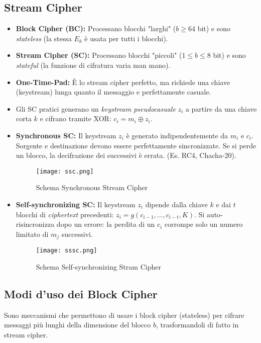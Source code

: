 \documentclass[../main.tex]{subfiles}
\begin{document}
\subsection{Stream Cipher}
\begin{itemize}
    \item \textbf{Block Cipher (BC):} Processano blocchi "larghi" ($b \ge 64$ bit) e sono \emph{stateless} (la stessa $E_k$ è usata per tutti i blocchi).
    \item \textbf{Stream Cipher (SC):} Processano blocchi "piccoli" ($1 \le b \le 8$ bit) e sono \emph{stateful} (la funzione di cifratura varia man mano).
    \item \textbf{One-Time-Pad:} È lo stream cipher perfetto, ma richiede una chiave (keystream) lunga quanto il messaggio e perfettamente casuale.
    \item Gli SC pratici generano un \emph{keystream pseudocasuale} $z_i$ a partire da una chiave corta $k$ e cifrano tramite XOR: $c_i = m_i \oplus z_i$.
    \item \textbf{Synchronous SC:} Il keystream $z_i$ è generato indipendentemente da $m_i$ e $c_i$. Sorgente e destinazione devono essere perfettamente sincronizzate. Se si perde un blocco, la decifrazione dei successivi è errata. (Es. RC4, Chacha-20).
    
   \begin{figure}[H]
     \centering
     \texttt{[image: ssc.png]}
     \caption{Schema Synchronous Stream Cipher}
     \label{fig:etichetta}
   \end{figure}
    
    \item \textbf{Self-synchronizing SC:} Il keystream $z_i$ dipende dalla chiave $k$ e dai $t$ blocchi di \emph{ciphertext} precedenti: $z_i = g(c_{i-1}, ..., c_{i-t}, K)$. Si auto-risincronizza dopo un errore: la perdita di un $c_i$ corrompe solo un numero limitato di $m_j$ successivi.
    
      \begin{figure}[H]
        \centering
        \texttt{[image: sssc.png]}
        \caption{Schema Self-synchronizing Stram Cipher}
        \label{fig:etichetta}
      \end{figure}
      
\end{itemize}

\subsection{Modi d'uso dei Block Cipher}
Sono meccanismi che permettono di usare i block cipher (stateless) per cifrare messaggi più lunghi della dimensione del blocco $b$, trasformandoli di fatto in stream cipher.
\end{document}

